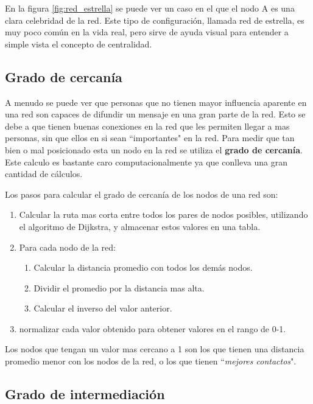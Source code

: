 En la figura \ref{fig:red_estrella} se puede ver un caso en el que el nodo A es una clara celebridad de la red. Este tipo de configuración, llamada red de estrella, es muy poco común en la vida real, pero sirve de ayuda visual para entender a simple vista el concepto de centralidad.

\subsection{Grado de cercanía}

A menudo se puede ver que personas que no tienen mayor influencia aparente en una red son capaces de difundir un mensaje en una gran parte de la red. Esto se debe a que tienen buenas conexiones en la red que les permiten llegar a mas personas, sin que ellos en si sean ``importantes" en la red. Para medir que tan bien o mal posicionado esta un nodo en la red se utiliza el \textbf{grado de cercanía}. Este calculo es bastante caro computacionalmente ya que conlleva una gran cantidad de cálculos.

Los pasos para calcular el grado de cercanía de los nodos de una red son:

\begin{enumerate}
  \item Calcular la ruta mas corta entre todos los pares de nodos posibles, utilizando el algoritmo de Dijkstra, y almacenar estos valores en una tabla.
  \item Para cada nodo de la red:
  \begin{enumerate}
    \item Calcular la distancia promedio con todos los demás nodos.
    \item Dividir el promedio por la distancia mas alta.
    \item Calcular el inverso del valor anterior.
  \end{enumerate}
  \item normalizar cada valor obtenido para obtener valores en el rango de 0-1.
\end{enumerate}

Los nodos que tengan un valor mas cercano a 1 son los que tienen una distancia promedio menor con los nodos de la red, o los que tienen ``\textit{mejores contactos}".

\subsection{Grado de intermediación}

